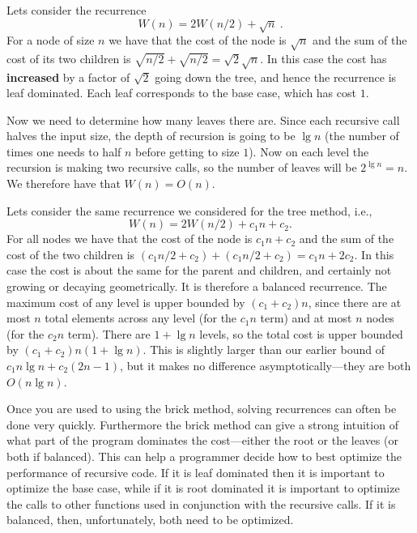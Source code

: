 \begin{example}
Lets consider the recurrence 
\[
W(n) = 2W(n/2) + \sqrt{n}~.
\]
%
For a node of size $n$ we have that the cost of the node is $\sqrt{n}$ and 
the sum of the cost of its two children is $\sqrt{n/2} + \sqrt{n/2} =
\sqrt{2} \sqrt{n}$. 
%
In this case the cost has \textbf{increased} by a factor of $\sqrt{2}$ going down the 
tree, and hence the recurrence is leaf dominated.     
%
Each leaf corresponds to the base case, which has cost $1$.

Now we need to determine how many leaves there are. 
Since each recursive call halves the input size, the depth of
recursion is going to be $\lg n$ (the number of times one needs to
half $n$ before getting to size $1$).   Now on each level the recursion is
making two recursive calls, so the number of leaves will be $2^{\lg n}
= n$.    We therefore have that $W(n) = O(n)$.
\end{example}

\begin{example}[Balanced]
Lets consider the same recurrence we considered for the tree method, i.e.,
\[W(n) = 2 W(n/2) + c_1 n + c_2.\]
For all nodes we have that the cost of the node is $c_1 n + c_2$ and
the sum of the cost of the two children is $(c_1 n/2 + c_2) + (c_1 n/2
+ c_2) = c_1 n + 2 c_2$.    In this case
the cost is about the same for the parent and children, and certainly not growing or decaying
geometrically.   It is therefore a balanced recurrence.    The maximum
cost of any level is upper bounded by $(c_1 + c_2) n$, since there are
at most $n$ total elements across any level (for the $c_1 n$ term) and
at most $n$ nodes (for the $c_2 n$ term).
There are $1 + \lg n$ levels, so the total cost is upper bounded
by $(c_1 + c_2) n (1 + \lg n)$.   This is slightly larger than our
earlier bound of $c_1  n \lg n + c_2 (2n - 1)$, but it makes no
difference asymptotically---they are both $O(n \lg n)$.
\end{example}

\begin{remark}
  Once you are used to using the brick method, solving recurrences can 
  often be done very quickly.   Furthermore the brick method can give a 
  strong intuition of what part of the program dominates the
  cost---either the root or the leaves (or both if balanced).    This
  can help a programmer decide how to best optimize the performance of
  recursive code.    If it is leaf
  dominated then it is important to optimize the base case, while if
  it is root dominated it is important to optimize the calls to other
  functions used in conjunction with the recursive calls.   If it is
  balanced, then, unfortunately, both need to be optimized.
\end{remark}

